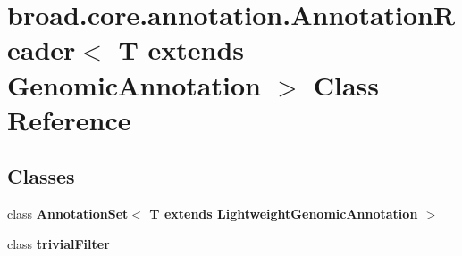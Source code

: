 \hypertarget{classbroad_1_1core_1_1annotation_1_1_annotation_reader_3_01_t_01extends_01_genomic_annotation_01_4}{\section{broad.\+core.\+annotation.\+Annotation\+Reader$<$ T extends Genomic\+Annotation $>$ Class Reference}
\label{classbroad_1_1core_1_1annotation_1_1_annotation_reader_3_01_t_01extends_01_genomic_annotation_01_4}
}
\subsection*{Classes}
\begin{DoxyCompactItemize}
\item 
class {\bfseries Annotation\+Set$<$ T extends Lightweight\+Genomic\+Annotation $>$}
\item 
class {\bfseries trivial\+Filter}
\end{DoxyCompactItemize}

